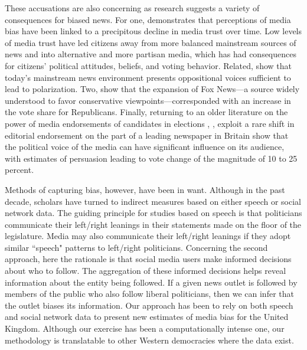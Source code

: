 \documentclass[12pt, letterpaper]{article}
\begin{document}
These accusations are also concerning as research suggests a variety of consequences for biased news. For one, \citet{ladd2011} demonstrates that perceptions of media bias have been linked to a precipitous decline in media trust over time. Low levels of media trust have led citizens away from more balanced mainstream sources of news and into alternative and more partisan media, which has had consequences for citizens' political attitudes, beliefs, and voting behavior. Related, \citet{arceneaux2012} show that today's mainstream news environment presents oppositional voices sufficient to lead to polarization. Two, \citet{dellavigna2007} show that the expansion of Fox News---a source widely understood to favor conservative viewpoints---corresponded with an increase in the vote share for Republicans. Finally, returning to an older literature on the power of media endorsements of candidates in elections \citep[e.g][]{erikson1976}, \citet{ladd2009}, exploit a rare shift in editorial endorsement on the part of a leading newspaper in Britain show that the political voice of the media can have significant influence on its audience, with estimates of persuasion leading to vote change of the magnitude of 10 to 25 percent.

Methods of capturing bias, however, have been in want. Although in the past decade, scholars have turned to indirect measures based on either speech or social network data. The guiding principle for studies based on speech is that politicians communicate their left/right leanings in their statements made on the floor of the legislature. Media may also communicate their left/right leanings if they adopt similar ``speech" patterns to left/right politicians. Concerning the second approach, here the rationale is that social media users make informed decisions about who to follow. The aggregation of these informed decisions helps reveal information about the entity being followed. If a given news outlet is followed by members of the public who also follow liberal politicians, then we can infer that the outlet biases its information. Our approach has been to rely on both speech and social network data to present new estimates of media bias for the United Kingdom. Although our exercise has been a computationally intense one, our methodology is translatable to other Western democracies where the data exist.

\clearpage
\normalfont
\normalsize
\doublespace



\clearpage
\end{document}

